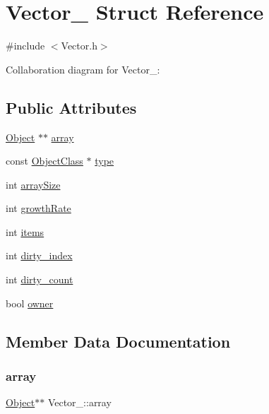 \hypertarget{structVector__}{}\section{Vector\+\_\+ Struct Reference}
\label{structVector__}


{\ttfamily \#include $<$Vector.\+h$>$}



Collaboration diagram for Vector\+\_\+\+:
\subsection*{Public Attributes}
\begin{DoxyCompactItemize}
\item 
\hyperlink{Object_8h_a32b67ad7134cd31b5ec5ed9c6a2d3978}{Object} $\ast$$\ast$ \hyperlink{structVector___a158a7e6d6fd56f7a9696f2ec82d34670}{array}
\item 
const \hyperlink{Object_8h_a6feb151c3b8f61fae503dfbcdc3d6a54}{Object\+Class} $\ast$ \hyperlink{structVector___a221da0f6dd6bf4aa24ce59522fbb69b4}{type}
\item 
int \hyperlink{structVector___ac95ed0505fc2374b15bbc48527b26501}{array\+Size}
\item 
int \hyperlink{structVector___aed377bbe6baa8c4a978cf44d37167166}{growth\+Rate}
\item 
int \hyperlink{structVector___a0e7bdc016fe801ff47b2fbe190cabe00}{items}
\item 
int \hyperlink{structVector___ab94983191b3d32fc585cbaa747e23fdb}{dirty\+\_\+index}
\item 
int \hyperlink{structVector___adc4fb9e129fd6c7be16778f485d950de}{dirty\+\_\+count}
\item 
bool \hyperlink{structVector___ac59d1524ee143b9f3cbd3a399a5a1595}{owner}
\end{DoxyCompactItemize}


\subsection{Member Data Documentation}
\mbox{\label{structVector___a158a7e6d6fd56f7a9696f2ec82d34670}} 
\subsubsection{\texorpdfstring{array}{array}}
{\footnotesize\ttfamily \hyperlink{Object_8h_a32b67ad7134cd31b5ec5ed9c6a2d3978}{Object}$\ast$$\ast$ Vector\+\_\+\+::array}

